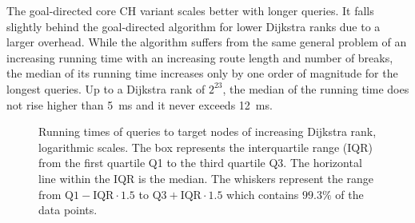 The goal-directed core CH variant scales better with longer queries. It falls slightly behind the goal-directed algorithm for lower Dijkstra ranks due to a larger overhead. While the algorithm suffers from the same general problem of an increasing running time with an increasing route length and number of breaks, the median of its running time increases only by one order of magnitude for the longest queries. Up to a Dijkstra rank of $2^{23}$, the median of the running time does not rise higher than \SI{5}{\milli\second} and it never exceeds \SI{12}{\milli\second}.

\begin{figure}[hbtp]
	\centering
	\hfill
	\caption[Running times of queries to target nodes of increasing Dijkstra rank, logarithmic scales.]{Running times of queries to target nodes of increasing Dijkstra rank, logarithmic scales. The box represents the interquartile range (IQR) from the first quartile Q1 to the third quartile Q3. The horizontal line within the IQR is the median. The whiskers represent the range from $\text{Q1} - \text{IQR} \cdot 1.5$ to $\text{Q3} + \text{IQR} \cdot 1.5$ which contains $99.3\%$ of the data points.}
	\label{fig:rank_times}
\end{figure}


